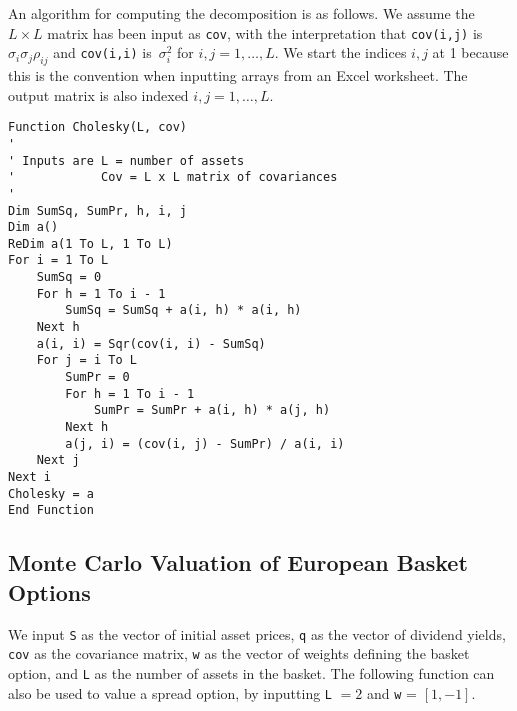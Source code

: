 An algorithm for computing the decomposition is as follows.  We assume the $L\times L$ matrix has been input as \verb!cov!, with the interpretation that \verb!cov(i,j)! is $\sigma_i\sigma_j\rho_{ij}$ and \verb!cov(i,i)! is~$\sigma_i^2$ for $i, j = 1, \ldots, L$.  We start the indices $i,j$ at 1 because this is the convention when inputting arrays from an Excel worksheet.  The output matrix is also indexed $i,j = 1, \ldots, L$.

\small\begin{verbatim}
Function Cholesky(L, cov)
'
' Inputs are L = number of assets
'            Cov = L x L matrix of covariances
'
Dim SumSq, SumPr, h, i, j
Dim a()
ReDim a(1 To L, 1 To L)
For i = 1 To L
    SumSq = 0
    For h = 1 To i - 1
        SumSq = SumSq + a(i, h) * a(i, h)
    Next h
    a(i, i) = Sqr(cov(i, i) - SumSq)
    For j = i To L
        SumPr = 0
        For h = 1 To i - 1
            SumPr = SumPr + a(i, h) * a(j, h)
        Next h
        a(j, i) = (cov(i, j) - SumPr) / a(i, i)
    Next j
Next i
Cholesky = a
End Function
\end{verbatim}\normalsize

\subsection*{Monte Carlo Valuation of European Basket Options}

We input \verb!S! as the vector of initial asset prices, \verb!q! as the vector of dividend yields, \verb!cov! as the covariance matrix, \verb!w! as the vector of weights defining the basket option, and \verb!L! as the number of assets in the basket.  The following function can also be used to value a spread option, by inputting \verb!L! $=2$ and \verb!w! = $[1, -1]$.

